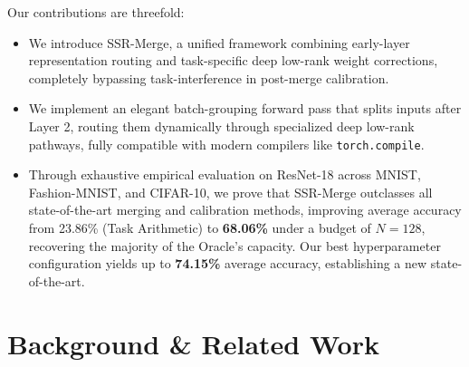 \documentclass{article}
\theoremstyle{plain}
\theoremstyle{definition}
\theoremstyle{remark}
\begin{document}
Our contributions are threefold:
\begin{itemize}
    \item We introduce SSR-Merge, a unified framework combining early-layer representation routing and task-specific deep low-rank weight corrections, completely bypassing task-interference in post-merge calibration.
    \item We implement an elegant batch-grouping forward pass that splits inputs after Layer 2, routing them dynamically through specialized deep low-rank pathways, fully compatible with modern compilers like \texttt{torch.compile}.
    \item Through exhaustive empirical evaluation on ResNet-18 across MNIST, Fashion-MNIST, and CIFAR-10, we prove that SSR-Merge outclasses all state-of-the-art merging and calibration methods, improving average accuracy from 23.86\% (Task Arithmetic) to \textbf{68.06\%} under a budget of $N=128$, recovering the majority of the Oracle's capacity. Our best hyperparameter configuration yields up to \textbf{74.15\%} average accuracy, establishing a new state-of-the-art.
\end{itemize}

\section{Background \& Related Work}
\label{submission:related}
\end{document}
